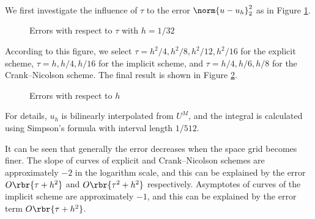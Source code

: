 \documentclass[english, nochinese]{pkupaper}
\begin{document}
\begin{thmquestion}
\ 
\begin{thmanswer}
We first investigate the influence of $\tau$ to the error $ \norm{ u - u_h }_2^2 $ as in Figure \ref{Fig:Time}.

\begin{figure}[htbp]
\centering
\scalebox{1.0}{}
\caption{Errors with respect to $\tau$ with $ h = 1 / 32 $}
\label{Fig:Time}
\end{figure}

According to this figure, we select $ \tau = h^2 / 4, h^2 / 8, h^2 / 12, h^2 / 16 $ for the explicit scheme, $ \tau = h, h / 4, h / 16 $ for the implicit scheme, and $ \tau = h / 4, h / 6, h / 8 $ for the Crank--Nicolson scheme. The final result is shown in Figure \ref{Fig:Space}.

\begin{figure}[htbp]
\centering
\scalebox{1.0}{}
\caption{Errors with respect to $h$}
\label{Fig:Space}
\end{figure}

For details, $u_h$ is bilinearly interpolated from $U^M$, and the integral is calculated using Simpson's formula with interval length $ 1 / 512 $.

It can be seen that generally the error decreases when the space grid becomes finer. The slope of curves of explicit and Crank--Nicolson schemes are approximately $-2$ in the logarithm scale, and this can be explained by the error $ O \rbr{ \tau + h^2 } $ and $ O \rbr{ \tau^2 + h^2 } $ respectively. Asymptotes of curves of the implicit scheme are approximately $-1$, and this can be explained by the error term $ O \rbr{ \tau + h^2 } $.
\end{thmanswer}
\end{thmquestion}
\end{document}
